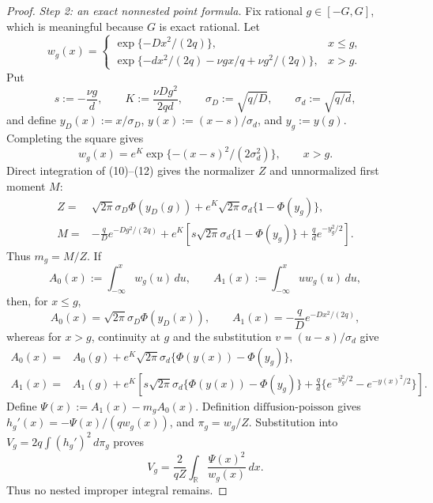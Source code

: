 \documentclass{article}
\begin{document}
\begin{proof}
\emph{Step 2: an exact nonnested point formula.}
Fix rational \(g\in[-G,G]\), which is meaningful because \(G\) is exact rational.  Let
\[
 w_g(x)=
 \begin{cases}
 \exp\{-Dx^2/(2q)\},&x\leq g,\\
 \exp\{-dx^2/(2q)-\nu gx/q+\nu g^2/(2q)\},&x>g.
 \end{cases}
\tag{10}
\]
Put
\[
 s:=-\frac{\nu g}{d},\qquad
 K:=\frac{\nu Dg^2}{2qd},\qquad
 \sigma_D:=\sqrt{q/D},\qquad \sigma_d:=\sqrt{q/d},
\tag{11}
\]
and define \(y_D(x):=x/\sigma_D\), \(y(x):=(x-s)/\sigma_d\), and \(y_g:=y(g)\).  Completing the square gives
\[
 w_g(x)=e^K\exp\{-(x-s)^2/(2\sigma_d^2)\},\qquad x>g.
\tag{12}
\]
Direct integration of (10)--(12) gives the normalizer \(Z\) and unnormalized first moment \(M\):
\[
 \begin{aligned}
 Z={}&\sqrt{2\pi}\sigma_D\Phi(y_D(g))
 +e^K\sqrt{2\pi}\sigma_d\{1-\Phi(y_g)\},\\
 M={}&-\frac qD e^{-Dg^2/(2q)}
 +e^K\left[s\sqrt{2\pi}\sigma_d\{1-\Phi(y_g)\}
 +\frac qd e^{-y_g^2/2}\right].
 \end{aligned}
\tag{13}
\]
Thus \(m_g=M/Z\).  If
\[
 A_0(x):=\int_{-\infty}^xw_g(u)\,du,
 \qquad A_1(x):=\int_{-\infty}^xuw_g(u)\,du,
\tag{14}
\]
then, for \(x\leq g\),
\[
 A_0(x)=\sqrt{2\pi}\sigma_D\Phi(y_D(x)),
 \qquad A_1(x)=-\frac qD e^{-Dx^2/(2q)},
\tag{15}
\]
whereas for \(x>g\), continuity at \(g\) and the substitution \(v=(u-s)/\sigma_d\) give
\[
 \begin{aligned}
 A_0(x)={}&A_0(g)+e^K\sqrt{2\pi}\sigma_d
 \{\Phi(y(x))-\Phi(y_g)\},\\
 A_1(x)={}&A_1(g)+e^K\left[s\sqrt{2\pi}\sigma_d
 \{\Phi(y(x))-\Phi(y_g)\}
 +\frac qd\{e^{-y_g^2/2}-e^{-y(x)^2/2}\}\right].
 \end{aligned}
\tag{16}
\]
Define \(\Psi(x):=A_1(x)-m_gA_0(x)\).  Definition \(\mathrm{diffusion\mbox{-}poisson}\) gives \(h_g'(x)=-\Psi(x)/(qw_g(x))\), and \(\pi_g=w_g/Z\).  Substitution into \(V_g=2q\int(h_g')^2\,d\pi_g\) proves
\[
 V_g=\frac2{qZ}\int_{\mathbb R}\frac{\Psi(x)^2}{w_g(x)}\,dx.
\tag{17}
\]
Thus no nested improper integral remains.


\end{proof}
\end{document}
